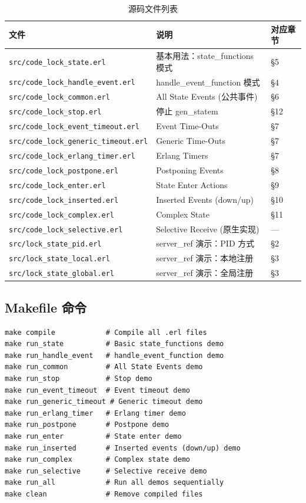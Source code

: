 \documentclass[a4paper,11pt]{article}
\begin{document}
\begin{table}[H]
\centering
\begin{tabular}{@{}lll@{}}
\toprule
\textbf{文件} & \textbf{说明} & \textbf{对应章节} \\
\midrule
\texttt{src/code\_lock\_state.erl} & 基本用法：state\_functions 模式 & \S5 \\
\texttt{src/code\_lock\_handle\_event.erl} & handle\_event\_function 模式 & \S4 \\
\texttt{src/code\_lock\_common.erl} & All State Events (公共事件) & \S6 \\
\texttt{src/code\_lock\_stop.erl} & 停止 gen\_statem & \S12 \\
\texttt{src/code\_lock\_event\_timeout.erl} & Event Time-Outs & \S7 \\
\texttt{src/code\_lock\_generic\_timeout.erl} & Generic Time-Outs & \S7 \\
\texttt{src/code\_lock\_erlang\_timer.erl} & Erlang Timers & \S7 \\
\texttt{src/code\_lock\_postpone.erl} & Postponing Events & \S8 \\
\texttt{src/code\_lock\_enter.erl} & State Enter Actions & \S9 \\
\texttt{src/code\_lock\_inserted.erl} & Inserted Events (down/up) & \S10 \\
\texttt{src/code\_lock\_complex.erl} & Complex State & \S11 \\
\texttt{src/code\_lock\_selective.erl} & Selective Receive (原生实现) & --- \\
\texttt{src/lock\_state\_pid.erl} & server\_ref 演示：PID 方式 & \S2 \\
\texttt{src/lock\_state\_local.erl} & server\_ref 演示：本地注册 & \S3 \\
\texttt{src/lock\_state\_global.erl} & server\_ref 演示：全局注册 & \S3 \\
\bottomrule
\end{tabular}
\caption{源码文件列表}
\end{table}

\subsection{Makefile 命令}

\begin{lstlisting}[style=shellstyle, caption={src/Makefile 可用命令}]
make compile            # Compile all .erl files
make run_state          # Basic state_functions demo
make run_handle_event   # handle_event_function demo
make run_common         # All State Events demo
make run_stop           # Stop demo
make run_event_timeout  # Event timeout demo
make run_generic_timeout # Generic timeout demo
make run_erlang_timer   # Erlang timer demo
make run_postpone       # Postpone demo
make run_enter          # State enter demo
make run_inserted       # Inserted events (down/up) demo
make run_complex        # Complex state demo
make run_selective      # Selective receive demo
make run_all            # Run all demos sequentially
make clean              # Remove compiled files
\end{lstlisting}
\end{document}
